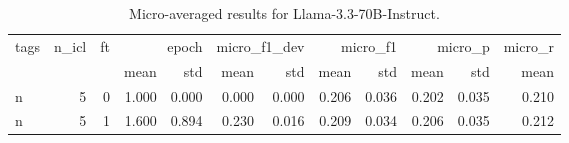 \begin{table}
\caption{Micro-averaged results for Llama-3.3-70B-Instruct.}
\label{results_micro}
\begin{tabular}{lrrrrrrrrrrr}
\toprule
tags & n\_icl & ft & \multicolumn{2}{r}{epoch} & \multicolumn{2}{r}{micro\_f1\_dev} & \multicolumn{2}{r}{micro\_f1} & \multicolumn{2}{r}{micro\_p} & micro\_r \\
 &  &  & mean & std & mean & std & mean & std & mean & std & mean \\
\midrule
n & 5 & 0 & 1.000 & 0.000 & 0.000 & 0.000 & 0.206 & 0.036 & 0.202 & 0.035 & 0.210 \\
n & 5 & 1 & 1.600 & 0.894 & 0.230 & 0.016 & 0.209 & 0.034 & 0.206 & 0.035 & 0.212 \\
\bottomrule
\end{tabular}
\end{table}
